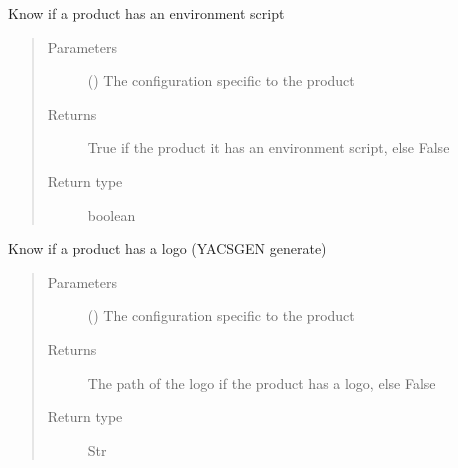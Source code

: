 \documentclass[a4paper,10pt,english]{sphinxmanual}
\begin{document}

\begin{fulllineitems}
\label{\detokenize{commands/apidoc/src:src.product.product_has_env_script}}
Know if a product has an environment script
\begin{quote}\begin{description}
\item[{Parameters}] \leavevmode
{} () \textendash{} The configuration specific to 
the product

\item[{Returns}] \leavevmode
True if the product it has an environment script, else False

\item[{Return type}] \leavevmode
boolean

\end{description}\end{quote}

\end{fulllineitems}


\begin{fulllineitems}
\label{\detokenize{commands/apidoc/src:src.product.product_has_logo}}
Know if a product has a logo (YACSGEN generate)
\begin{quote}\begin{description}
\item[{Parameters}] \leavevmode
{} () \textendash{} The configuration specific to 
the product

\item[{Returns}] \leavevmode
The path of the logo if the product has a logo, else False

\item[{Return type}] \leavevmode
Str

\end{description}\end{quote}

\end{fulllineitems}
\end{document}
